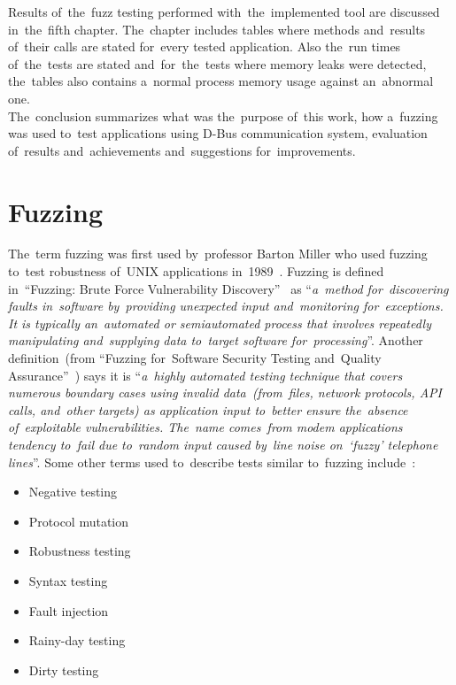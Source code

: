 \newpage
Results of~the~fuzz testing performed with~the~implemented tool are discussed
in~the~fifth chapter. The~chapter includes tables where methods and~results
of~their calls are stated for~every tested application. Also the~run times
of~the~tests are stated and~for~the~tests where memory leaks were detected,
the~tables also contains a~normal process memory usage against an~abnormal one.\\

The~conclusion summarizes what was the~purpose of~this work, how a~fuzzing was used
to~test applications using \mbox{D-Bus} communication system, evaluation of~results
and~achievements and~suggestions for~improvements.



\chapter{Fuzzing}
The~term fuzzing was first used by~professor Barton Miller who used fuzzing to~test
robustness of~UNIX applications in~1989~\cite{Fuzzing2}. Fuzzing is defined
in~``Fuzzing: Brute Force Vulnerability Discovery''~\cite[p.~22]{Fuzzing} as
``\emph{a~method for~discovering faults in~software by~providing unexpected
input and~monitoring for~exceptions. It is typically an~automated or semiautomated
process that involves repeatedly manipulating and~supplying data to~target software
for~processing}''.
Another definition~(from ``Fuzzing for~Software Security Testing and~Quality
Assurance''~\cite[p.~1]{Fuzzing2}) says it is ``\emph{a~highly automated testing
technique that covers numerous boundary cases using invalid data~(from~files,
network protocols, API calls, and~other targets) as application input to~better
ensure the~absence of~exploitable vulnerabilities. The~name comes~from modem
applications tendency to~fail due to~random input caused by~line noise on~`fuzzy'
telephone lines}''. Some other terms used to~describe tests similar to~fuzzing
include~\cite[p.~24]{Fuzzing2}:
\begin{itemize}
	\item Negative testing
	\item Protocol mutation
	\item Robustness testing
	\item Syntax testing
	\item Fault injection
	\item Rainy-day testing
	\item Dirty testing
\end{itemize}

